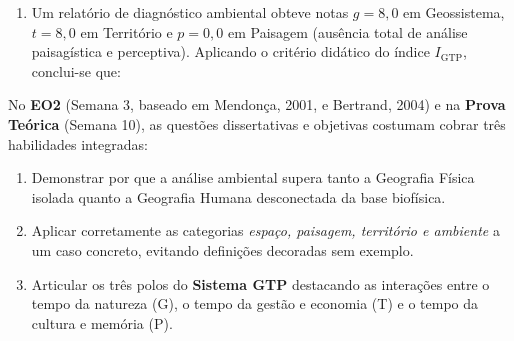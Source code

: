 \begin{enumerate}[leftmargin=1.8em, itemsep=5pt, resume]
  \item Um relatório de diagnóstico ambiental obteve notas $g = 8{,}0$ em Geossistema, $t = 8{,}0$ em Território e $p = 0{,}0$ em Paisagem (ausência total de análise paisagística e perceptiva). Aplicando o critério didático do índice $I_{\text{GTP}}$, conclui-se que:
  \espacoResolucao[1.2cm]
\end{enumerate}


\begin{boxDica}
No \textbf{EO2} (Semana 3, baseado em Mendonça, 2001, e Bertrand, 2004) e na \textbf{Prova Teórica} (Semana 10), as questões dissertativas e objetivas costumam cobrar três habilidades integradas:
\begin{enumerate}[leftmargin=1.5em, itemsep=1.5pt]
  \item Demonstrar por que a análise ambiental supera tanto a Geografia Física isolada quanto a Geografia Humana desconectada da base biofísica.
  \item Aplicar corretamente as categorias \textit{espaço, paisagem, território e ambiente} a um caso concreto, evitando definições decoradas sem exemplo.
  \item Articular os três polos do \textbf{Sistema GTP} destacando as interações entre o tempo da natureza (G), o tempo da gestão e economia (T) e o tempo da cultura e memória (P).
\end{enumerate}
\end{boxDica}

